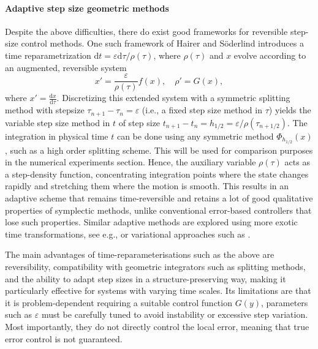 \documentclass[final,3p,times]{elsarticle}
\newcommand{\rd}{\mathrm{d}}
\begin{document}
\paragraph{Adaptive step size geometric methods}  
Despite the above difficulties, there do exist good frameworks for reversible step-size control methods. One such framework of Hairer and Söderlind \cite{hairer2005explicit} introduces a time reparametrization $\rd t = \varepsilon \rd\tau / \rho(\tau)$, where $\rho(\tau)$ and $x$ evolve according to an augmented, reversible system
\begin{equation}\label{hairer-soderlind}
x' = \frac{\varepsilon}{\rho(\tau)} f(x), \quad \rho' = G(x),
\end{equation}
where $x' = \frac{\rd x}{\rd \tau}$. Discretizing this extended system with a symmetric splitting method with stepsize $\tau_{n+1}-\tau_{n}=\varepsilon$ (i.e., a fixed step size method in $\tau$) yields the variable step size method in $t$ of step size $t_{n+1}-t_n = h_{1/2}=\varepsilon/\rho(\tau_{n+1/2})$. The integration in physical time $t$ can be done using any symmetric method $\Phi_{h_{1/2}}(x)$, such as a high order splitting scheme. This will be used for comparison purposes in the numerical experiments section. Hence, the auxiliary variable $\rho(\tau)$ acts as a step-density function, concentrating integration points where the state changes rapidly and stretching them where the motion is smooth. This results in an adaptive scheme that remains time-reversible and retains a lot of good qualitative properties of symplectic methods, unlike conventional error-based controllers that lose such properties. Similar adaptive methods are explored using more exotic time transformations, see e.g., \cite{blanes2005adaptive, blanes2012explicit} or variational approaches such as \cite{duruisseaux2021adaptive}.

The main advantages of time-reparameterisations such as the above are reversibility, compatibility with geometric integrators such as splitting methods, and the ability to adapt step sizes in a structure-preserving way, making it particularly effective for systems with varying time scales. Its limitations are that it is problem-dependent requiring a suitable control function $G(y)$, parameters such as $\varepsilon$ must be carefully tuned to avoid instability or excessive step variation. Most importantly, they do not directly control the local error, meaning that true error control is not guaranteed.
\end{document}
